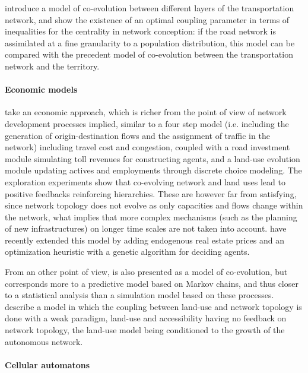 \documentclass[galley]{jtlu-article-2col}
\begin{document}
\cite{ding2017heuristic} introduce a model of co-evolution between different layers of the transportation network, and show the existence of an optimal coupling parameter in terms of inequalities for the centrality in network conception: if the road network is assimilated at a fine granularity to a population distribution, this model can be compared with the precedent model of co-evolution between the transportation network and the territory.

\paragraph{Economic models}

\cite{levinson2007co} take an economic approach, which is richer from the point of view of network development processes implied, similar to a four step model (i.e. including the generation of origin-destination flows and the assignment of traffic in the network) including travel cost and congestion, coupled with a road investment module simulating toll revenues for constructing agents, and a land-use evolution module updating actives and employments through discrete choice modeling. The exploration experiments show that co-evolving network and land uses lead to positive feedbacks reinforcing hierarchies. These are however far from satisfying, since network topology does not evolve as only capacities and flows change within the network, what implies that more complex mechanisms (such as the planning of new infrastructures) on longer time scales are not taken into account. \cite{li2016integrated} have recently extended this model by adding endogenous real estate prices and an optimization heuristic with a genetic algorithm for deciding agents.


From an other point of view, \cite{levinson2005paving} is also presented as a model of co-evolution, but corresponds more to a predictive model based on Markov chains, and thus closer to a statistical analysis than a simulation model based on these processes. \cite{rui2011urban} describe a model in which the coupling between land-use and network topology is done with a weak paradigm, land-use and accessibility having no feedback on network topology, the land-use model being conditioned to the growth of the autonomous network.



\paragraph{Cellular automatons}
\end{document}
